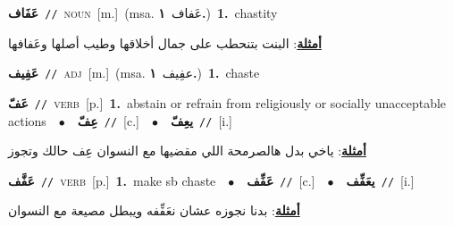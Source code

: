 \documentclass[10pt,a4paper,twoside]{article} %
\begin{document}
\begin{multicols}{2}
{\setlength\topsep{0pt}\textbf{\foreignlanguage{arabic}{عَفَاف}}\ {\color{gray}\texttt{//}\color{black}}\ \textsc{noun}\ [m.]\ \color{gray}(msa. \foreignlanguage{arabic}{عَفاف}~\foreignlanguage{arabic}{\textbf{١.}})\color{black}\ \textbf{1.}~chastity\  \begin{flushright}\color{gray}\foreignlanguage{arabic}{\textbf{\underline{\foreignlanguage{arabic}{أمثلة}}}: البنت بتنحطب على جمال أخلاقها وطيب أصلها وعَفافها}\end{flushright}\color{black}} \vspace{2mm}

{\setlength\topsep{0pt}\textbf{\foreignlanguage{arabic}{عَفِيف}}\ {\color{gray}\texttt{//}\color{black}}\ \textsc{adj}\ [m.]\ \color{gray}(msa. \foreignlanguage{arabic}{عفِيف}~\foreignlanguage{arabic}{\textbf{١.}})\color{black}\ \textbf{1.}~chaste\ } \vspace{2mm}

{\setlength\topsep{0pt}\textbf{\foreignlanguage{arabic}{عَفّ}}\ {\color{gray}\texttt{//}\color{black}}\ \textsc{verb}\ [p.]\ \textbf{1.}~abstain or refrain from religiously or socially unacceptable actions\ \ $\bullet$\ \ \setlength\topsep{0pt}\textbf{\foreignlanguage{arabic}{عِفّ}}\ {\color{gray}\texttt{//}\color{black}}\ [c.]\ \ $\bullet$\ \ \setlength\topsep{0pt}\textbf{\foreignlanguage{arabic}{يعِفّ}}\ {\color{gray}\texttt{//}\color{black}}\ [i.]\  \begin{flushright}\color{gray}\foreignlanguage{arabic}{\textbf{\underline{\foreignlanguage{arabic}{أمثلة}}}: ياخي بدل هالصرمحة اللي مقضيها مع النسوان عِف حالك وتجوز}\end{flushright}\color{black}} \vspace{2mm}

{\setlength\topsep{0pt}\textbf{\foreignlanguage{arabic}{عَفَّف}}\ {\color{gray}\texttt{//}\color{black}}\ \textsc{verb}\ [p.]\ \textbf{1.}~make sb chaste\ \ $\bullet$\ \ \setlength\topsep{0pt}\textbf{\foreignlanguage{arabic}{عَفِّف}}\ {\color{gray}\texttt{//}\color{black}}\ [c.]\ \ $\bullet$\ \ \setlength\topsep{0pt}\textbf{\foreignlanguage{arabic}{يعَفِّف}}\ {\color{gray}\texttt{//}\color{black}}\ [i.]\  \begin{flushright}\color{gray}\foreignlanguage{arabic}{\textbf{\underline{\foreignlanguage{arabic}{أمثلة}}}: بدنا نجوزه عشان نعَفِّفه ويبطل مصيعة مع النسوان}\end{flushright}\color{black}} \vspace{2mm}


\end{multicols}
\end{document}
